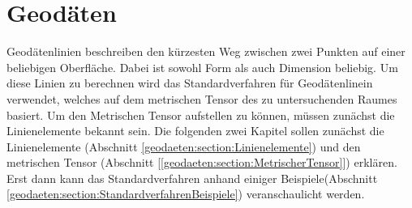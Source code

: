 %
%
%
%
\chapter{Geodäten\label{chapter:geodaeten}}
\begin{refsection}

Geodätenlinien beschreiben den kürzesten Weg zwischen zwei Punkten auf einer beliebigen Oberfläche.
Dabei ist sowohl Form als auch Dimension beliebig.
Um diese Linien zu berechnen wird das Standardverfahren für Geodätenlinein verwendet, welches auf dem metrischen Tensor des zu untersuchenden Raumes basiert.
Um den Metrischen Tensor aufstellen zu können, müssen zunächst die Linienelemente bekannt sein.
Die folgenden zwei Kapitel sollen zunächst die Linienelemente (Abschnitt \ref{geodaeten:section:Linienelemente}) und den metrischen Tensor (Abschnitt [\ref{geodaeten:section:MetrischerTensor}]) erklären.
Erst dann kann das Standardverfahren anhand einiger Beispiele(Abschnitt \ref{geodaeten:section:StandardverfahrenBeispiele}) veranschaulicht werden.





\printbibliography[heading=subbibliography]
\end{refsection}

